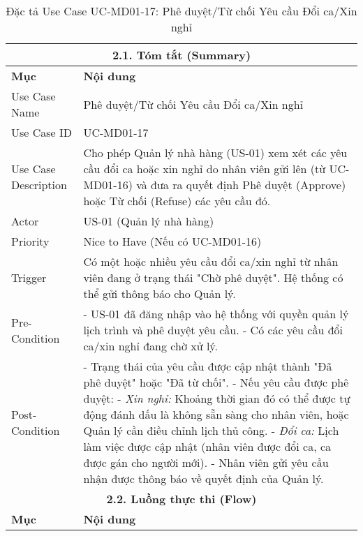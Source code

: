 \begin{longtable}{|m{4cm}|p{11cm}|}
\caption{Đặc tả Use Case UC-MD01-17: Phê duyệt/Từ chối Yêu cầu Đổi ca/Xin nghỉ} \label{tab:uc_md01_17_revised} \\
\hline
\multicolumn{2}{|c|}{\textbf{2.1. Tóm tắt (Summary)}} \\
\hline
\textbf{Mục} & \textbf{Nội dung} \\
\hline
\endhead %
\hline
\endfoot %
\hline
\endlastfoot %
Use Case Name & Phê duyệt/Từ chối Yêu cầu Đổi ca/Xin nghỉ \\
\hline
Use Case ID & UC-MD01-17 \\
\hline
Use Case Description & Cho phép Quản lý nhà hàng (US-01) xem xét các yêu cầu đổi ca hoặc xin nghỉ do nhân viên gửi lên (từ UC-MD01-16) và đưa ra quyết định Phê duyệt (Approve) hoặc Từ chối (Refuse) các yêu cầu đó. \\
\hline
Actor & US-01 (Quản lý nhà hàng) \\
\hline
Priority & Nice to Have (Nếu có UC-MD01-16) \\
\hline
Trigger & Có một hoặc nhiều yêu cầu đổi ca/xin nghỉ từ nhân viên đang ở trạng thái "Chờ phê duyệt". Hệ thống có thể gửi thông báo cho Quản lý. \\
\hline
Pre-Condition & - US-01 đã đăng nhập vào hệ thống với quyền quản lý lịch trình và phê duyệt yêu cầu. \newline - Có các yêu cầu đổi ca/xin nghỉ đang chờ xử lý. \\
\hline
Post-Condition & - Trạng thái của yêu cầu được cập nhật thành "Đã phê duyệt" hoặc "Đã từ chối". \newline - Nếu yêu cầu được phê duyệt: \newline    - \textit{Xin nghỉ:} Khoảng thời gian đó có thể được tự động đánh dấu là không sẵn sàng cho nhân viên, hoặc Quản lý cần điều chỉnh lịch thủ công. \newline    - \textit{Đổi ca:} Lịch làm việc được cập nhật (nhân viên được đổi ca, ca được gán cho người mới). \newline - Nhân viên gửi yêu cầu nhận được thông báo về quyết định của Quản lý. \\
\hline
\multicolumn{2}{|c|}{\textbf{2.2. Luồng thực thi (Flow)}} \\
\hline
\textbf{Mục} & \textbf{Nội dung} \\
\hline

\end{longtable}
